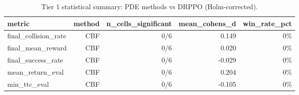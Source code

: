 \begin{table}[htbp]
\centering
\caption{Tier 1 statistical summary: PDE methods vs DRPPO (Holm-corrected).}
\label{tab:tier1_stats}
\begin{tabular}{lrrrr}
\toprule
metric & method & n\_cells\_significant & mean\_cohens\_d & win\_rate\_pct \\
\midrule
final\_collision\_rate & CBF & 0/6 & 0.149 & 0\% \\
final\_mean\_reward & CBF & 0/6 & 0.020 & 0\% \\
final\_success\_rate & CBF & 0/6 & -0.029 & 0\% \\
mean\_return\_eval & CBF & 0/6 & 0.204 & 0\% \\
min\_ttc\_eval & CBF & 0/6 & -0.105 & 0\% \\
\bottomrule
\end{tabular}
\end{table}
